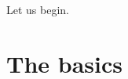 \documentclass[a4paper]{memoir}
\theoremstyle{definition}
\begin{document}
Let us begin.

\cleardoublepage
\begin{KeepFromToc}
\tableofcontents*
\end{KeepFromToc}

\mainmatter


\chapter{The basics}








\end{document}
